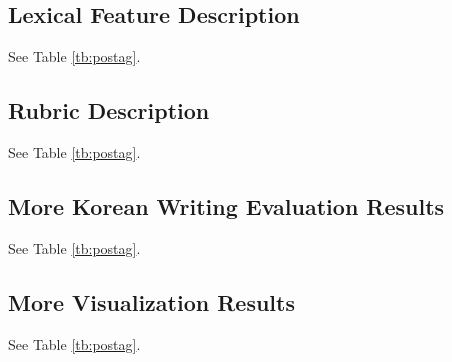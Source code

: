 \subsection{Lexical Feature Description}
See Table \ref{tb:postag}.


\subsection{Rubric Description}
See Table \ref{tb:postag}.

\subsection{More Korean Writing Evaluation Results}
See Table \ref{tb:postag}.

\subsection{More Visualization Results}
See Table \ref{tb:postag}.